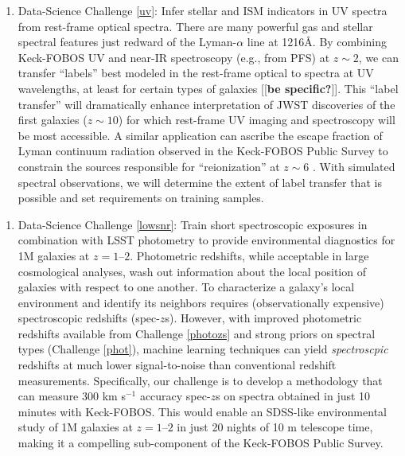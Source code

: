 \documentclass[oneside,11pt]{amsart}
\newcommand{\comment}[2][todo]{{\color{#1}[[{\bf #2}]]}}
\newcounter{chalno}
\newcommand{\chal}[1]{\refstepcounter{chalno}\label{#1}}
\begin{document}
\begin{enumerate}[rightmargin=0.2cm,leftmargin=0.2cm]
%
\chal{uv}
%
\item[] {\textsf {\large Data-Science Challenge \ref{uv}: Infer stellar
and ISM indicators in UV spectra from rest-frame optical spectra}}.
There are many powerful gas and stellar spectral features just redward
of the Lyman-$\alpha$ line at 1216\AA.  By combining Keck-FOBOS UV and
near-IR spectroscopy (e.g., from PFS) at $z \sim 2$, we can transfer
``labels'' best modeled in the rest-frame optical to spectra at UV
wavelengths, at least for certain types of galaxies \comment{be
specific?}.  This ``label transfer'' will dramatically enhance
interpretation of JWST discoveries of the first galaxies ($z \sim 10$)
for which rest-frame UV imaging and spectroscopy will be most
accessible.  A similar application can ascribe the escape fraction of
Lyman continuum radiation observed in the Keck-FOBOS Public Survey to
constrain the sources responsible for ``reionization'' at $z \sim 6$
\citep[cf.]{2018ApJ...869..123S}.  With simulated spectral observations,
we will determine the extent of label transfer that is possible and set
requirements on training samples.

\end{enumerate}

%

\begin{enumerate}[rightmargin=0.2cm,leftmargin=0.2cm]
\chal{lowsnr}
%
\item[] {\textsf {\large Data-Science Challenge \ref{lowsnr}: Train short
spectroscopic exposures in combination with LSST photometry to provide
environmental diagnostics for 1M galaxies at $z=1$--$2$}}.  Photometric
redshifts, while acceptable in large cosmological analyses, wash out
information about the local position of galaxies with respect to one
another.  To characterize a galaxy's local environment and identify its
neighbors requires (observationally expensive) spectroscopic redshifts
(spec-$z$s).  However, with improved photometric redshifts available
from Challenge \ref{photozs} and strong priors on spectral types
(Challenge \ref{phot}), machine learning techniques can yield
\emph{spectroscpic} redshifts at much lower signal-to-noise than
conventional redshift measurements. Specifically, our challenge is to
develop a methodology that can measure 300 km s$^{-1}$ accuracy
spec-$z$s on spectra obtained in just 10 minutes with Keck-FOBOS.  This
would enable an SDSS-like environmental study of 1M galaxies at
$z=1$--$2$ in just 20 nights of 10 m telescope time, making it a
compelling sub-component of the Keck-FOBOS Public Survey.

\end{enumerate}
\end{document}
